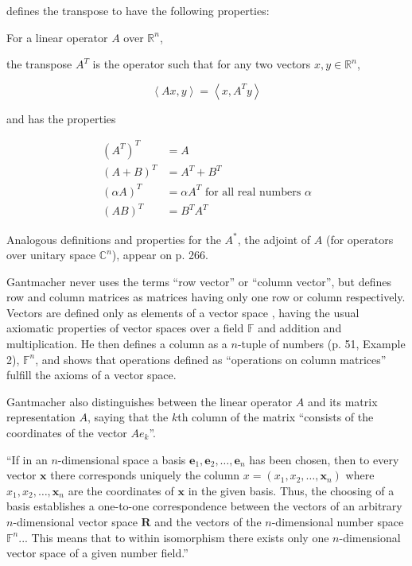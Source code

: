 \cite[p. 280, Definition 10]{Gantmacher1960} defines the transpose to have the following properties:

For a linear operator $A$ over $\mathbb R^n$,

the transpose $A^T$ is the operator such that for any two vectors $x, y \in \mathbb R^n$,

\[
\left\langle Ax, y \right\rangle = \left\langle x, A^T y \right\rangle
\]

and has the properties

\begin{align}
{(A^T)}^T & = A \\
{(A + B)}^T & = A^T + B^T \\
{(\alpha A)}^T & = \alpha A^T \textrm{ for all real numbers } \alpha \\
{(A B)}^T & = B^T A^T
\end{align}

Analogous definitions and properties for the $A^*$, the adjoint of $A$ (for operators over unitary space $\mathbb C^n$), appear on p. 266.

Gantmacher never uses the terms ``row vector'' or ``column vector'', but defines row and column matrices as matrices having only one row or column respectively. Vectors are defined only as elements of a vector space \cite[p. 51]{Gantmacher1960}, having the usual axiomatic properties of vector spaces over a field $\mathbb F$ and addition and multiplication. He then defines a column as a $n$-tuple of numbers (p. 51, Example 2), $\mathbb F^n$, and shows that operations defined as ``operations on column matrices'' fulfill the axioms of a vector space.

Gantmacher also distinguishes \cite[pp. 54-56]{Gantmacher1960} between the linear operator $A$ and its matrix representation $A$, saying that the $k$th column of the matrix ``consists of the coordinates of the vector $Ae_k$''.

``If in an $n$-dimensional space a basis $\mathbf e_1, \mathbf e_2, \dots, \mathbf e_n$ has been chosen, then to every vector $\mathbf x$ there corresponds uniquely the column $x = (x_1, x_2, \dots, \mathbf x_n)$ where $x_1, x_2, \dots, \mathbf x_n$ are the coordinates of $\mathbf x$ in the given basis. Thus, the choosing of a basis establishes a one-to-one correspondence between the vectors of an arbitrary $n$-dimensional vector space $\mathbf R$ and the vectors of the $n$-dimensional number space $\mathbb F^n$... This means that to within isomorphism there exists only one $n$-dimensional vector space of a given number field.''

